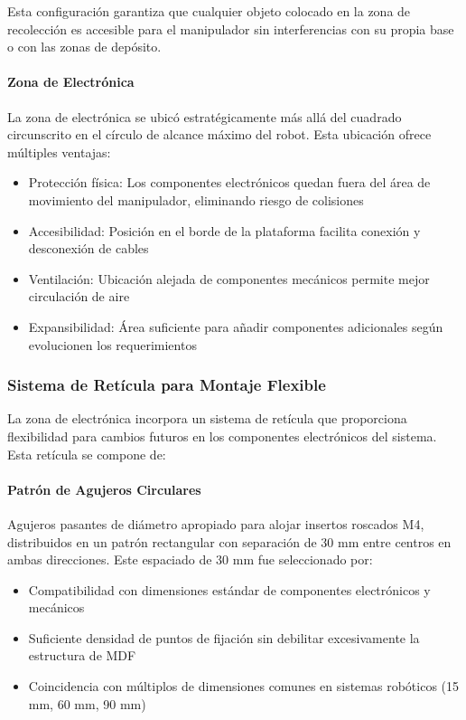 Esta configuración garantiza que cualquier objeto colocado en la zona de recolección es accesible para el manipulador sin interferencias con su propia base o con las zonas de depósito.

\paragraph{Zona de Electrónica}

La zona de electrónica se ubicó estratégicamente más allá del cuadrado circunscrito en el círculo de alcance máximo del robot. Esta ubicación ofrece múltiples ventajas:

\begin{itemize}
    \item Protección física: Los componentes electrónicos quedan fuera del área de movimiento del manipulador, eliminando riesgo de colisiones
    \item Accesibilidad: Posición en el borde de la plataforma facilita conexión y desconexión de cables
    \item Ventilación: Ubicación alejada de componentes mecánicos permite mejor circulación de aire
    \item Expansibilidad: Área suficiente para añadir componentes adicionales según evolucionen los requerimientos
\end{itemize}

\subsubsection{Sistema de Retícula para Montaje Flexible}

La zona de electrónica incorpora un sistema de retícula que proporciona flexibilidad para cambios futuros en los componentes electrónicos del sistema. Esta retícula se compone de:

\paragraph{Patrón de Agujeros Circulares}
Agujeros pasantes de diámetro apropiado para alojar insertos roscados M4, distribuidos en un patrón rectangular con separación de 30 mm entre centros en ambas direcciones. Este espaciado de 30 mm fue seleccionado por:

\begin{itemize}
    \item Compatibilidad con dimensiones estándar de componentes electrónicos y mecánicos
    \item Suficiente densidad de puntos de fijación sin debilitar excesivamente la estructura de MDF
    \item Coincidencia con múltiplos de dimensiones comunes en sistemas robóticos (15 mm, 60 mm, 90 mm)
\end{itemize}

